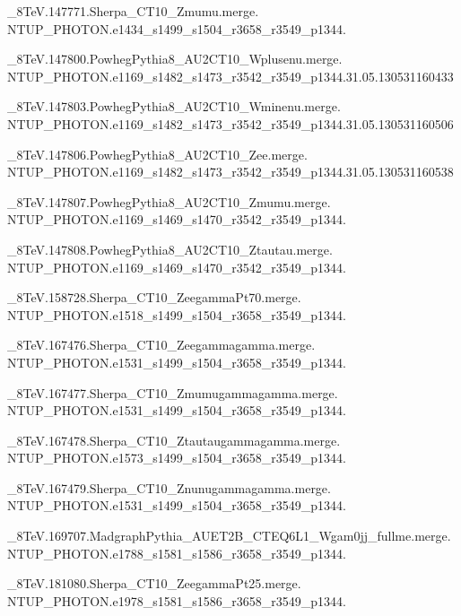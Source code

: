 \_8TeV.147771.Sherpa\_CT10\_Zmumu.merge. \\NTUP\_PHOTON.e1434\_s1499\_s1504\_r3658\_r3549\_p1344.

\_8TeV.147800.PowhegPythia8\_AU2CT10\_Wplusenu.merge. \\NTUP\_PHOTON.e1169\_s1482\_s1473\_r3542\_r3549\_p1344.31.05.130531160433

\_8TeV.147803.PowhegPythia8\_AU2CT10\_Wminenu.merge. \\NTUP\_PHOTON.e1169\_s1482\_s1473\_r3542\_r3549\_p1344.31.05.130531160506

\_8TeV.147806.PowhegPythia8\_AU2CT10\_Zee.merge. \\NTUP\_PHOTON.e1169\_s1482\_s1473\_r3542\_r3549\_p1344.31.05.130531160538

\_8TeV.147807.PowhegPythia8\_AU2CT10\_Zmumu.merge. \\NTUP\_PHOTON.e1169\_s1469\_s1470\_r3542\_r3549\_p1344.

\_8TeV.147808.PowhegPythia8\_AU2CT10\_Ztautau.merge. \\NTUP\_PHOTON.e1169\_s1469\_s1470\_r3542\_r3549\_p1344.

\_8TeV.158728.Sherpa\_CT10\_ZeegammaPt70.merge. \\NTUP\_PHOTON.e1518\_s1499\_s1504\_r3658\_r3549\_p1344.

\_8TeV.167476.Sherpa\_CT10\_Zeegammagamma.merge. \\NTUP\_PHOTON.e1531\_s1499\_s1504\_r3658\_r3549\_p1344.

\_8TeV.167477.Sherpa\_CT10\_Zmumugammagamma.merge. \\NTUP\_PHOTON.e1531\_s1499\_s1504\_r3658\_r3549\_p1344.

\_8TeV.167478.Sherpa\_CT10\_Ztautaugammagamma.merge. \\NTUP\_PHOTON.e1573\_s1499\_s1504\_r3658\_r3549\_p1344.

\_8TeV.167479.Sherpa\_CT10\_Znunugammagamma.merge. \\NTUP\_PHOTON.e1531\_s1499\_s1504\_r3658\_r3549\_p1344.

\_8TeV.169707.MadgraphPythia\_AUET2B\_CTEQ6L1\_Wgam0jj\_fullme.merge. \\NTUP\_PHOTON.e1788\_s1581\_s1586\_r3658\_r3549\_p1344.

\_8TeV.181080.Sherpa\_CT10\_ZeegammaPt25.merge. \\NTUP\_PHOTON.e1978\_s1581\_s1586\_r3658\_r3549\_p1344.
